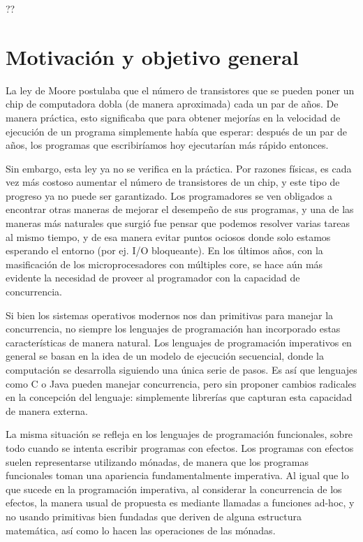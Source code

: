 \documentclass[11pt,a4paper]{article}
\begin{document}
??

\section{Motivación y objetivo general}

La ley de Moore postulaba que el número de transistores que se pueden
poner un chip de computadora dobla (de manera aproximada) cada un par
de años. De manera práctica, esto significaba que para obtener
mejorías en la velocidad de ejecución de un programa simplemente había
que esperar: después de un par de años, los programas que escribiríamos
hoy ejecutarían más rápido entonces.

Sin embargo, esta ley ya no se verifica en la práctica. Por razones
físicas, es cada vez más costoso aumentar el número de transistores de
un chip, y este tipo de progreso ya no puede ser garantizado. Los
programadores se ven obligados a encontrar otras maneras de mejorar el
desempeño de sus programas, y una de las maneras más naturales que
surgió fue pensar que podemos resolver varias tareas al mismo tiempo,
y de esa manera evitar puntos ociosos donde solo estamos esperando el
entorno (por ej. I/O bloqueante). En los últimos años, con la
masificación de los microprocesadores con múltiples core, se hace aún
más evidente la necesidad de proveer al programador con la capacidad
de concurrencia.

Si bien los sistemas operativos modernos nos dan primitivas para
manejar la concurrencia, no siempre los lenguajes de programación han
incorporado estas características de manera natural. Los lenguajes de
programación imperativos en general se basan en la idea de un modelo
de ejecución secuencial, donde la computación se desarrolla siguiendo
una única serie de pasos. Es así que lenguajes como C o Java pueden
manejar concurrencia, pero sin proponer cambios radicales en la
concepción del lenguaje: simplemente librerías que capturan esta
capacidad de manera externa.

La misma situación se refleja en los lenguajes de programación
funcionales, sobre todo cuando se intenta escribir programas con
efectos. Los programas con efectos suelen representarse utilizando
mónadas, de manera que los programas funcionales toman una apariencia
fundamentalmente imperativa. Al igual que lo que sucede en la
programación imperativa, al considerar la concurrencia de los efectos, la
manera usual de propuesta es mediante llamadas a funciones ad-hoc, y
no usando primitivas bien fundadas que deriven de alguna estructura
matemática, así como lo hacen las operaciones de las mónadas.
\end{document}

